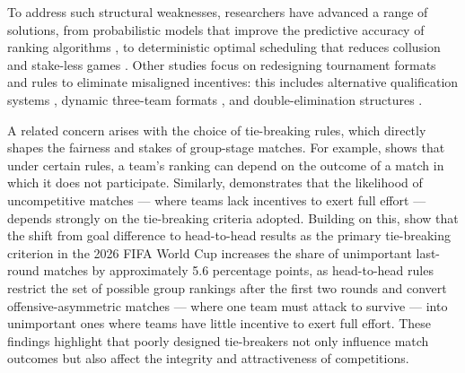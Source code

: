 \documentclass[11pt]{article}
\begin{document}
To address such structural weaknesses, researchers have advanced a range of solutions, from probabilistic models that improve the predictive accuracy of ranking algorithms \citep{szczecinski2022fifa}, to deterministic optimal scheduling that reduces collusion and stake-less games \citep{chater2021fixing}. Other studies focus on redesigning tournament formats and rules to eliminate misaligned incentives: this includes alternative qualification systems \citep{guajardo2024tournament}, dynamic three-team formats \citep{troyano2023new}, and double-elimination structures \citep{renno2023double}.

\vspace{0.5em}

A related concern arises with the choice of tie-breaking rules, which directly shapes the fairness and stakes of group-stage matches. For example, \citet{berker2014tie} shows that under certain rules, a team's ranking can depend on the outcome of a match in which it does not participate. Similarly, \citet{csato2023avoid} demonstrates that the likelihood of uncompetitive matches — where teams lack incentives to exert full effort — depends strongly on the tie-breaking criteria adopted. Building on this, \citet{csato2026match} show that the shift from goal difference to head-to-head results as the primary tie-breaking criterion in the 2026 FIFA World Cup increases the share of unimportant last-round matches by approximately 5.6 percentage points, as head-to-head rules restrict the set of possible group rankings after the first two rounds and convert offensive-asymmetric matches — where one team must attack to survive — into unimportant ones where teams have little incentive to exert full effort. These findings highlight that poorly designed tie-breakers not only influence match outcomes but also affect the integrity and attractiveness of competitions.
\end{document}
